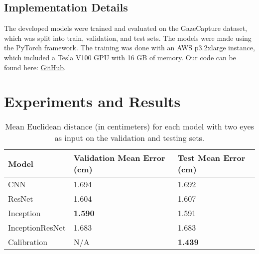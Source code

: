 \documentclass{article}
\begin{document}
\subsection{Implementation Details}
\label{section:implementation}
The developed models were trained and evaluated on the GazeCapture dataset, which was split into train, validation, and test sets. The models were made using the PyTorch framework. The training was done with an AWS p3.2xlarge instance, which included a Tesla V100 GPU with 16 GB of memory. Our code can be found here: \href{https://github.com/rishipython/One-Eye-is-All-You-Need-Lightweight-Ensembles-for-Gaze-Estimation-with-Single-Encoders}{GitHub}.

\section{Experiments and Results}
\begin{table}
  \caption{Mean Euclidean distance (in centimeters) for each model with two eyes as input on the validation and testing sets.}
  \centering
  \begin{tabular}{lll}
    \toprule
    Model     & Validation Mean Error (cm)     & Test Mean Error (cm) \\
    \midrule
    CNN & 1.694  & 1.692     \\
    ResNet     & 1.604 & 1.607      \\
    Inception     & 
    \textbf{1.590}       & 1.591  \\
    InceptionResNet     & 1.683       & 1.683  \\
    Calibration & N/A & \textbf{1.439} \\
    \bottomrule
  \end{tabular}
  \label{table:table1}
\end{table}
\end{document}
